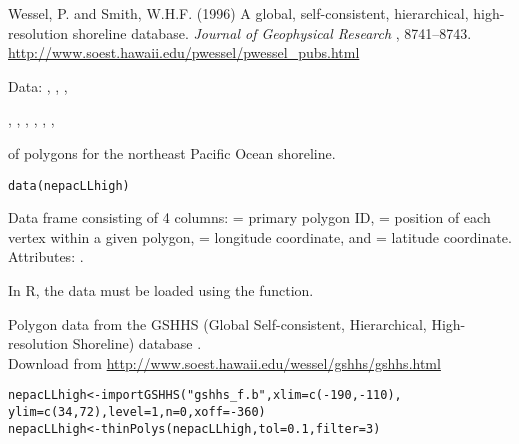 \documentclass[letterpaper]{book}
\begin{document}
%
\begin{References}\relax
Wessel, P. and Smith, W.H.F. (1996) A global, self-consistent,
hierarchical, high-resolution shoreline database. \emph{Journal of
Geophysical Research} , 8741--8743. \\{}
\url{http://www.soest.hawaii.edu/pwessel/pwessel_pubs.html}
\end{References}
%
\begin{SeeAlso}\relax
Data:  , , , 

, , , 
, , ,
\end{SeeAlso}
%
\begin{Description}\relax
{} of polygons for the northeast Pacific Ocean shoreline.
\end{Description}
%
\begin{Usage}
\begin{verbatim}
data(nepacLLhigh)
\end{verbatim}
\end{Usage}
%
\begin{Format}
Data frame consisting of 4 columns:  = primary polygon ID,
 = position of each vertex within a given polygon, 
= longitude coordinate, and  = latitude coordinate.  Attributes:
.
\end{Format}
%
\begin{Note}\relax
In R, the data must be loaded using the  function.
\end{Note}
%
\begin{Source}\relax
Polygon data from the GSHHS (Global Self-consistent, Hierarchical,
High-resolution Shoreline) database . \\{}
Download from \url{http://www.soest.hawaii.edu/wessel/gshhs/gshhs.html}

\begin{alltt}
nepacLLhigh <-importGSHHS("gshhs_f.b", xlim=c(-190,-110),
                 ylim=c(34,72), level=1, n=0, xoff=-360)
nepacLLhigh <- thinPolys(nepacLLhigh, tol=0.1, filter=3)
\end{alltt}

\end{Source}
\end{document}
